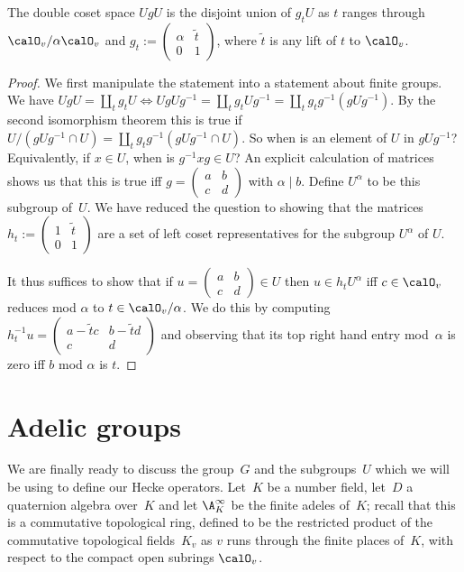 \begin{lemma}
  \label{nolean-U1-coset-decomposition}
  The double coset space $UgU$ is the disjoint union of $g_tU$ as $t$ ranges
  through $\calO_v/\alpha\calO_v$ and $g_t:=\begin{pmatrix}\alpha&\tilde{t}\\0&1\end{pmatrix}$,
  where $\tilde{t}$ is any lift of $t$ to $\calO_v$.
\end{lemma}
\begin{proof} We first manipulate the statement into a statement about finite groups.
  We have $UgU=\coprod_t g_tU\iff UgUg^{-1}=\coprod_t g_tUg^{-1}=\coprod_t g_tg^{-1}(gUg^{-1})$.
  By the second isomorphism theorem this is true if
  $U/(gUg^{-1}\cap U)=\coprod_t g_tg^{-1}(gUg^{-1}\cap U)$. So when is an element of $U$
  in $gUg^{-1}$? Equivalently, if $x\in U$, when is $g^{-1}xg\in U$? An explicit calculation
  of matrices shows us that this is true iff $g=\begin{pmatrix} a&b\\c&d\end{pmatrix}$ with
  $\alpha\mid b$. Define $U^\alpha$ to be this subgroup of~$U$. We have reduced the question
  to showing that the matrices $h_t:=\begin{pmatrix}1&\tilde{t}\\0&1\end{pmatrix}$
  are a set of left coset representatives for the subgroup $U^\alpha$ of $U$.

  It thus suffices to show that if $u=\begin{pmatrix} a&b\\c&d\end{pmatrix}\in U$
  then $u\in h_tU^\alpha$ iff $c\in\calO_v$ reduces mod $\alpha$ to $t\in\calO_v/\alpha$.
  We do this by computing $h_t^{-1}u=\begin{pmatrix} a-\tilde{t}c&b-\tilde{t}d\\c&d\end{pmatrix}$
  and observing that its top right hand entry mod~$\alpha$ is zero iff $b$ mod $\alpha$ is $t$.
\end{proof}

\section{Adelic groups}

We are finally ready to discuss the group~$G$ and the subgroups~$U$ which we will be
using to define our Hecke operators. Let~$K$ be a number field, let~$D$ a quaternion algebra
over~$K$ and let $\A_K^\infty$ be the finite adeles of~$K$; recall that this is a commutative
topological ring, defined to be the restricted
product of the commutative topological fields~$K_v$ as $v$ runs through the finite places
of~$K$, with respect to the compact open subrings $\calO_v$.

